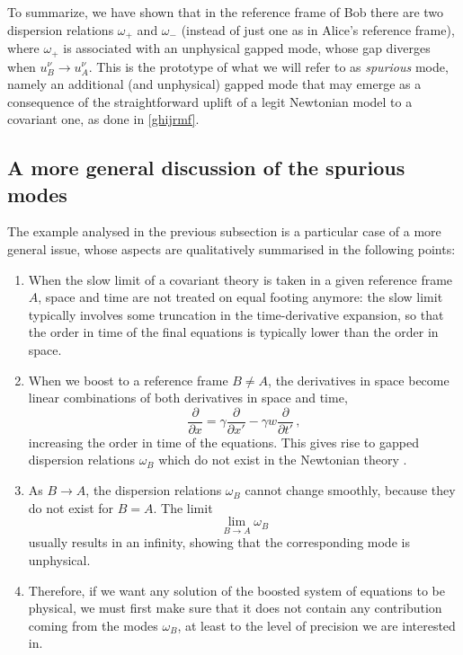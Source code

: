 \documentclass[a4paper, amsfonts, amssymb, amsmath, reprint, twocolumn, showkeys, nofootinbib]{revtex4-2}
\begin{document}
To summarize, we have shown that in the reference frame of Bob there are two dispersion relations $\omega_+$ and $\omega_-$ (instead of just one as in Alice's reference frame), where $\omega_+$ is associated with an unphysical gapped mode, whose gap diverges when $u_B^\nu \longrightarrow u_A^\nu$. 
This is the prototype of what we will refer to as \emph{spurious} mode, namely an additional (and unphysical) gapped mode that may emerge as a consequence of the straightforward uplift of a legit Newtonian model to a covariant one, as done in \eqref{ghijrmf}.

\subsection{A more general discussion of the spurious modes} 

The example analysed in the previous subsection is a particular case of a more general issue, whose aspects are qualitatively summarised in the following points:

\begin{enumerate}
\item[i-] When the slow limit of a covariant theory is taken in a given reference frame $A$, space and time are not treated on equal footing anymore: the slow limit typically involves some truncation in the time-derivative expansion, so that the order in time of the final equations is typically lower than the order in space.
\item[ii-] When we boost to a reference frame $B \neq A$, the derivatives in space become linear combinations of both derivatives in space and time,
\begin{equation}
\dfrac{\partial}{\partial x} = \gamma \dfrac{\partial}{\partial x'} -\gamma w \dfrac{\partial}{\partial t'} \, ,
\end{equation}
increasing the order in time of the equations. 
This gives rise to gapped dispersion relations $\omega_B$ which do not exist in the Newtonian theory \citep{GavassinoLyapunov_2020}.
\item[iii-] As $B \longrightarrow A$, the dispersion relations $\omega_B$ cannot change smoothly, because they do not exist for $B=A$. The limit  
\begin{equation}\label{mdokcploki}
\lim_{B \rightarrow A} \omega_B
\end{equation}
usually results in an infinity, showing that the corresponding mode is unphysical.
\item[iv-] Therefore, if we want any solution of the boosted system of equations to be physical, we must first make sure that it does not contain any contribution coming from the modes $\omega_B$, at least to the level of precision we are interested in.  
\end{enumerate}
\end{document}
